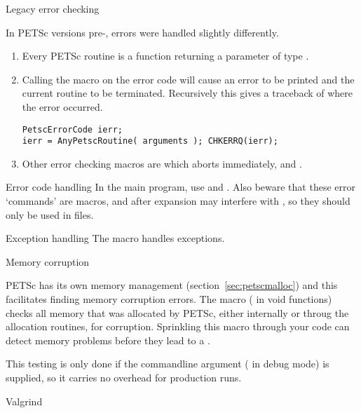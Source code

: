  {Legacy error checking}
\label{sec:petsc-chkerrq}

In PETSc versions pre-,
errors were handled slightly differently.

\begin{enumerate}
\item Every PETSc routine is a function returning a parameter of type
  .
\item Calling the macro  on the error code will
  cause an error to be printed and the current routine to be
  terminated. Recursively this gives a traceback of where the error
  occurred.
\begin{lstlisting}
PetscErrorCode ierr;
ierr = AnyPetscRoutine( arguments ); CHKERRQ(ierr);
\end{lstlisting}
\item Other error checking macros are 
  which aborts immediately, and .
\end{enumerate}

\begin{fortrannote}{Error code handling}
  In the main program, use  and
  . Also beware that these error `commands' are
  macros, and after expansion may interfere with
  , so they should only be
  used in  files.
\end{fortrannote}

\begin{cppnote}{Exception handling}
  The macro  handles exceptions.
\end{cppnote}

 {Memory corruption}
\label{sec:petsc-mem}

PETSc has its own memory management (section~\ref{sec:petscmalloc})
and this facilitates finding memory corruption errors.
The macro  ( in void functions)
checks all memory that was allocated by PETSc,
either internally or throug the allocation routines,
for corruption. Sprinkling this macro through your code
can detect memory problems before they lead to a .

This testing is only done if the commandline argument
 ( in debug mode)
is supplied, so it carries no overhead for production runs.

 {Valgrind}

